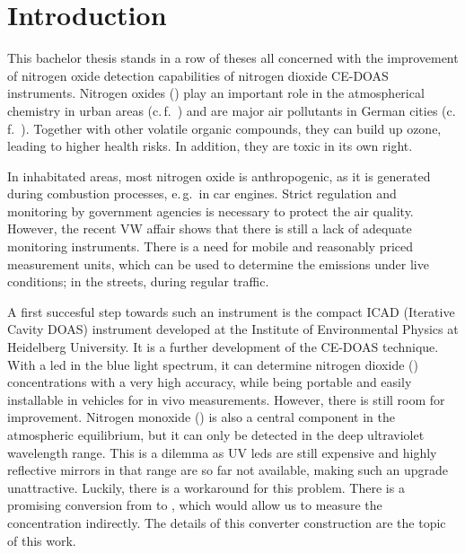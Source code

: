 \section{Introduction}
\label{sec:intro}

This bachelor thesis stands in a row of theses all concerned with the
improvement of nitrogen oxide detection capabilities of nitrogen
dioxide CE-DOAS instruments. Nitrogen oxides () play an
important role in the atmospherical chemistry in urban areas
(c.\,f.~\cite{roedel}) and are major air pollutants in German cities
(c.\,f.~\cite{no2schadstoff,who}). Together with other volatile
organic compounds, they can build up ozone, leading to higher health
risks. In addition, they are toxic in its own right.

In inhabitated areas, most nitrogen oxide is anthropogenic, as it is
generated during combustion processes, e.\,g.\ in car engines. Strict
regulation and monitoring by government agencies is necessary to
protect the air quality. However, the recent VW affair shows that
there is still a lack of adequate monitoring instruments. There is a
need for mobile and reasonably priced measurement units, which can be
used to determine the  emissions under live conditions; in
the streets, during regular traffic.

A first succesful step towards such an instrument is the compact
 ICAD (Iterative Cavity DOAS)
instrument developed at the Institute of Environmental Physics at
Heidelberg University. It is a further development of the CE-DOAS
technique. With a led in the blue light spectrum, it can determine
nitrogen dioxide () concentrations with a very high accuracy,
while being portable and easily installable in vehicles for in vivo
measurements. However, there is still room for improvement. Nitrogen
monoxide () is also a central component in the atmospheric
 equilibrium, but it can only be detected in the deep
ultraviolet wavelength range. This is a dilemma as UV leds are still
expensive and highly reflective mirrors in that range are so far not
available, making such an upgrade unattractive. Luckily, there is a
workaround for this problem. There is a promising conversion from
 to , which would allow us to measure the concentration
indirectly. The details of this converter construction are the topic
of this work.

